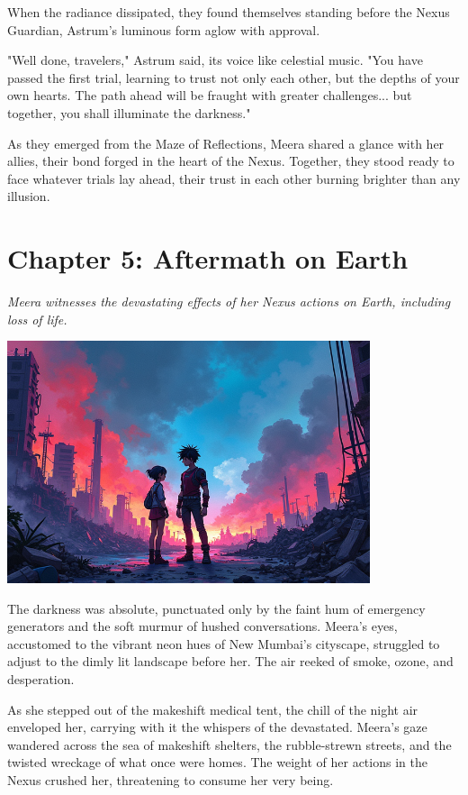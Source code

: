\documentclass[12pt]{book}
\begin{document}
When the radiance dissipated, they found themselves standing before the
Nexus Guardian, Astrum's luminous form aglow with approval.

"Well done, travelers," Astrum said, its voice like celestial music.
"You have passed the first trial, learning to trust not only each other,
but the depths of your own hearts. The path ahead will be fraught with
greater challenges... but together, you shall illuminate the darkness."

As they emerged from the Maze of Reflections, Meera shared a glance with
her allies, their bond forged in the heart of the Nexus. Together, they
stood ready to face whatever trials lay ahead, their trust in each other
burning brighter than any illusion.


\newpage

\chapter*{Chapter 5: Aftermath on Earth}
\textit{Meera witnesses the devastating effects of her Nexus actions on Earth, including loss of life.}

\begin{center}
\includegraphics[width=0.8\textwidth]{stories/my_story/step_6/scenes/earth_aftermath.live.png}
\end{center}

The darkness was absolute, punctuated only by the faint hum of emergency
generators and the soft murmur of hushed conversations. Meera's eyes,
accustomed to the vibrant neon hues of New Mumbai's cityscape, struggled
to adjust to the dimly lit landscape before her. The air reeked of
smoke, ozone, and desperation.

As she stepped out of the makeshift medical tent, the chill of the night
air enveloped her, carrying with it the whispers of the devastated.
Meera's gaze wandered across the sea of makeshift shelters, the
rubble-strewn streets, and the twisted wreckage of what once were homes.
The weight of her actions in the Nexus crushed her, threatening to
consume her very being.
\end{document}
